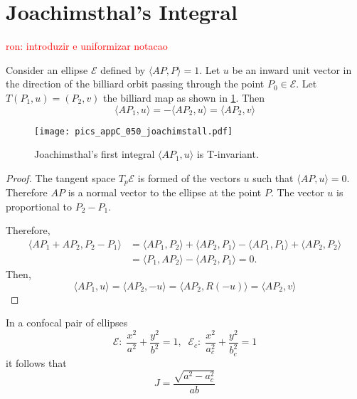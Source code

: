   

\section{Joachimsthal's Integral}

\textcolor{red}{ron: introduzir e uniformizar notacao}


\begin{proposition}\label{prop:invariant_joachim} Consider an ellipse $\mathcal{E}$ defined by $\langle A P,P\rangle=1$. Let $u$ be an inward unit vector in the direction of the billiard orbit passing through the point $P_0\in\mathcal{E} $. Let $T(P_1,u)=(P_2,v)$ the billiard map as shown in   \cref{fig:appC-joachim}.
	Then 
	\[  \langle A P_1,u\rangle =  -\langle A P_2,u\rangle=  \langle A P_2,v\rangle  \]
\label{prop:appA-joachim}
	\end{proposition}

\begin{figure}[H]
	\begin{center}
	 \texttt{[image: pics\_appC\_050\_joachimstall.pdf]}
		\caption {Joachimsthal's first integral  $\langle AP_1,u\rangle $ is T-invariant.}
		 \label{fig:appC-joachim}
	\end{center}
\end{figure}

\begin{proof} The tangent space  $T_{p}\mathcal{E}$ is formed of the vectors $u$ such that $ \langle A P,u\rangle =0.$ Therefore $AP$ is a normal vector to the ellipse at the point $P$. The vector $u$ is proportional to $P_2-P_1$.
	
	Therefore,
	\begin{align*}  \langle AP_1+AP_2 , P_2-P_1\rangle &= \langle AP_1  , P_2 \rangle + \langle AP_2  , P_1 \rangle  - \langle AP_1  , P_1 \rangle + \langle AP_2  , P_2 \rangle \\
	&= \langle  P_1  , AP_2 \rangle - \langle AP_2  , P_1 \rangle =0. 
	\end{align*}
	Then,
	\[ \langle AP_1 , u\rangle =\langle  AP_2 ,-u\rangle  =  \langle  AP_2 ,R(-u)\rangle  =  \langle  AP_2, v\rangle \]
	\end{proof}
	
	\begin{proposition}
	    In a confocal pair of ellipses
	    \[\mathcal{E}:\; \frac{x^2}{a^2}+\frac{y^2}{b^2}=1,\;\; \mathcal{E}_c:\; \frac{x^2}{a_c^2}+\frac{y^2}{b_c^2}=1\]
	    it follows that
	   \[ J  =\frac{\sqrt{  a^2 - a_c^2}}{a b} \]
	      \label{prop:appA-confocal-EE}
	\end{proposition}
	
